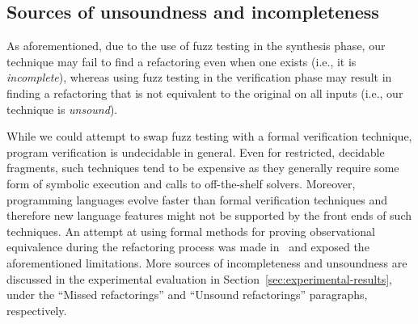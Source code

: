 \documentclass[conference]{IEEEtran}
\begin{document}








\subsection{Sources of unsoundness and incompleteness}\label{sec:incompleteness}
As aforementioned, due to the use of fuzz
testing in the synthesis phase, our technique may fail to find a
refactoring even when one exists (i.e., it is {\em incomplete}),
whereas using fuzz testing in the verification phase may result in
finding a refactoring that is not equivalent to the original on all
inputs (i.e., our technique is {\em unsound}).

While we could attempt to swap fuzz testing with a formal verification technique,
program verification is undecidable in general.
Even for restricted, decidable fragments, such
techniques tend to be expensive as they generally require some form of
symbolic execution and calls to off-the-shelf solvers.  Moreover,
programming languages evolve faster than formal verification techniques and
therefore new language features might not be supported by the front ends of
such techniques. An attempt at using formal methods for proving
observational equivalence during the refactoring process was made in~\cite{DBLP:journals/corr/abs-1712-07388} and exposed the aforementioned limitations.
%
More sources of incompleteness and unsoundness are discussed in the experimental evaluation in Section~\ref{sec:experimental-results},
under the ``Missed refactorings'' and ``Unsound refactorings'' paragraphs, respectively.
\end{document}
